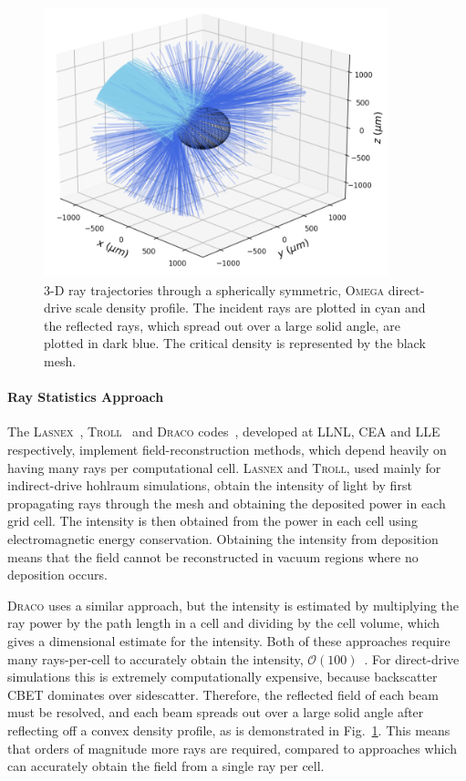 \begin{figure}[t!]
\includegraphics[width=10cm]{Numerics/Images/Reflected_Rays.png}
\centering
\caption{3-D ray trajectories through a spherically symmetric, \textsc{Omega} direct-drive scale density profile.
The incident rays are plotted in cyan and the reflected rays, which spread out over a large solid angle, are plotted in dark blue.
The critical density is represented by the black mesh.}%
\label{fig:reflectedrays}
\end{figure}

\paragraph*{Ray Statistics Approach} The \textsc{Lasnex}~\cite{strozzi_interplay_2017}, \textsc{Troll}~\cite{liberatore_first_2023} and \textsc{Draco} codes~\cite{marozas_wavelength-detuning_2018}, developed at \ac{LLNL}, \ac{CEA} and \ac{LLE} respectively, implement field-reconstruction methods, which depend heavily on having many rays per computational cell.
\textsc{Lasnex} and \textsc{Troll}, used mainly for indirect-drive hohlraum simulations, obtain the intensity of light by first propagating rays through the mesh and obtaining the deposited power in each grid cell.
The intensity is then obtained from the power in each cell using electromagnetic energy conservation.
Obtaining the intensity from deposition means that the field cannot be reconstructed in vacuum regions where no deposition occurs.

\textsc{Draco} uses a similar approach, but the intensity is estimated by multiplying the ray power by the path length in a cell and dividing by the cell volume, which gives a dimensional estimate for the intensity.
Both of these approaches require many rays-per-cell to accurately obtain the intensity, $\mathcal{O}(100)$~\cite{debayle_unified_2019}.
For direct-drive simulations this is extremely computationally expensive, because backscatter \ac{CBET} dominates over sidescatter.
Therefore, the reflected field of each beam must be resolved, and each beam spreads out over a large solid angle after reflecting off a convex density profile, as is demonstrated in Fig.~\ref{fig:reflectedrays}.
This means that orders of magnitude more rays are required, compared to approaches which can accurately obtain the field from a single ray per cell.

